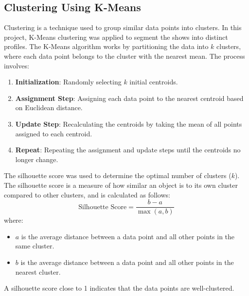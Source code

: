 \documentclass[sigconf]{acmart}
\begin{document}
	\subsection{Clustering Using K-Means}
	Clustering is a technique used to group similar data points into clusters. In this project, K-Means clustering was applied to segment the shows into distinct profiles. The K-Means algorithm works by partitioning the data into $k$ clusters, where each data point belongs to the cluster with the nearest mean. The process involves:
	\begin{enumerate}
		\item \textbf{Initialization}: Randomly selecting $k$ initial centroids.
		\item \textbf{Assignment Step}: Assigning each data point to the nearest centroid based on Euclidean distance.
		\item \textbf{Update Step}: Recalculating the centroids by taking the mean of all points assigned to each centroid.
		\item \textbf{Repeat}: Repeating the assignment and update steps until the centroids no longer change.
	\end{enumerate}
	The silhouette score was used to determine the optimal number of clusters ($k$). The silhouette score is a measure of how similar an object is to its own cluster compared to other clusters, and is calculated as follows:
	\begin{equation}
		\text{Silhouette Score} = \frac{b - a}{\max(a, b)}
	\end{equation}
	where:
	\begin{itemize}
		\item $a$ is the average distance between a data point and all other points in the same cluster.
		\item $b$ is the average distance between a data point and all other points in the nearest cluster.
	\end{itemize}
	A silhouette score close to 1 indicates that the data points are well-clustered.
\end{document}
